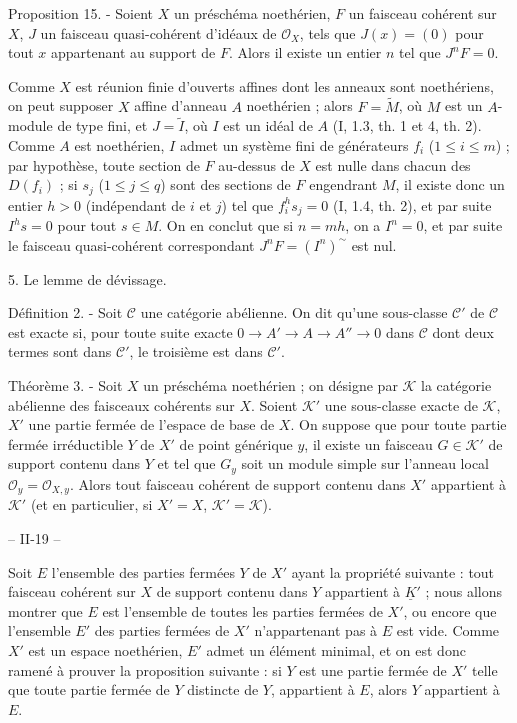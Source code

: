 Proposition 15. - Soient $X$ un préschéma noethérien, $F$ un faisceau cohérent sur $X$, $J$ un faisceau quasi-cohérent d'idéaux de $\mathcal{O}_X$, tels que $J(x) = (0)$ pour tout $x$ appartenant au support de $F$. Alors il existe un entier $n$ tel que $J^n F = 0$.

Comme $X$ est réunion finie d'ouverts affines dont les anneaux sont noethériens, on peut supposer $X$ affine d'anneau $A$ noethérien ; alors $F = \tilde{M}$, où $M$ est un $A$-module de type fini, et $J = \tilde{I}$, où $I$ est un idéal de $A$ (I, 1.3, th. 1 et 4, th. 2). Comme $A$ est noethérien, $I$ admet un système fini de générateurs $f_i$ ($1 \le i \le m$) ; par hypothèse, toute section de $F$ au-dessus de $X$ est nulle dans chacun des $D(f_i)$ ; si $s_j$ ($1 \le j \le q$) sont des sections de $F$ engendrant $M$, il existe donc un entier $h > 0$ (indépendant de $i$ et $j$) tel que $f_i^h s_j = 0$ (I, 1.4, th. 2), et par suite $I^h s = 0$ pour tout $s \in M$. On en conclut que si $n = mh$, on a $I^n = 0$, et par suite le faisceau quasi-cohérent correspondant $J^n F = (I^n)^{\sim}$ est nul.

5. Le lemme de dévissage.

Définition 2. - Soit $\mathcal{C}$ une catégorie abélienne. On dit qu'une sous-classe $\mathcal{C}'$ de $\mathcal{C}$ est exacte si, pour toute suite exacte $0 \to A' \to A \to A'' \to 0$ dans $\mathcal{C}$ dont deux termes sont dans $\mathcal{C}'$, le troisième est dans $\mathcal{C}'$.

Théorème 3. - Soit $X$ un préschéma noethérien ; on désigne par $\mathcal{K}$ la catégorie abélienne des faisceaux cohérents sur $X$. Soient $\mathcal{K}'$ une sous-classe exacte de $\mathcal{K}$, $X'$ une partie fermée de l'espace de base de $X$. On suppose que pour toute partie fermée irréductible $Y$ de $X'$ de point générique $y$, il existe un faisceau $G \in \mathcal{K}'$ de support contenu dans $Y$ et tel que $G_y$ soit un module simple sur l'anneau local $\mathcal{O}_y = \mathcal{O}_{X, y}$. Alors tout faisceau cohérent de support contenu dans $X'$ appartient à $\mathcal{K}'$ (et en particulier, si $X'=X$, $\mathcal{K}' = \mathcal{K}$).

\newpage


\noindent -- II-19 --

Soit $E$ l'ensemble des parties fermées $Y$ de $X'$ ayant la propriété suivante : tout faisceau cohérent sur $X$ de support contenu dans $Y$ appartient à $\underline{K}'$ ; nous allons montrer que $E$ est l'ensemble de toutes les parties fermées de $X'$, ou encore que l'ensemble $E'$ des parties fermées de $X'$ n'appartenant pas à $E$ est vide. Comme $X'$ est un espace noethérien, $E'$ admet un élément minimal, et on est donc ramené à prouver la proposition suivante : si $Y$ est une partie fermée de $X'$ telle que toute partie fermée de $Y$ distincte de $Y$, appartient à $E$, alors $Y$ appartient à $E$.

